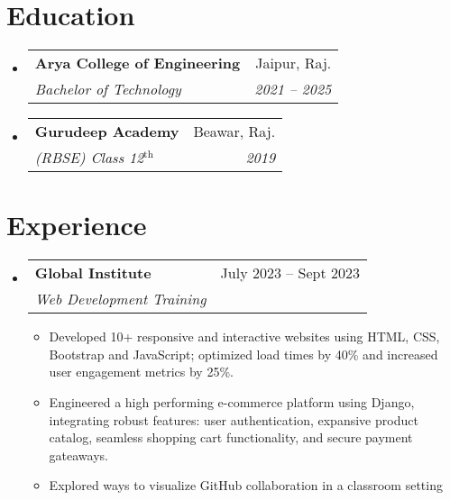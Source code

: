 \documentclass[letterpaper,11pt]{article}
\makeatletter
\newcommand{\resumeItem}[1]{
  \item\small{
    {#1 \vspace{-2pt}}
  }
}
\newcommand{\resumeSubheading}[4]{
  \vspace{-2pt}\item
    \begin{tabular*}{0.97\textwidth}[t]{l@{\extracolsep{\fill}}r}
      \textbf{#1} & #2 \\
      \textit{\small#3} & \textit{\small #4} \\
    \end{tabular*}\vspace{-7pt}
}
\newcommand{\resumeSubSubheading}[2]{
    \item
    \begin{tabular*}{0.97\textwidth}{l@{\extracolsep{\fill}}r}
      \textit{\small#1} & \textit{\small #2} \\
    \end{tabular*}\vspace{-7pt}
}
\newcommand{\resumeSubHeadingListStart}{\begin{itemize}[leftmargin=0.15in, label={}]}
\newcommand{\resumeSubHeadingListEnd}{\end{itemize}}
\newcommand{\resumeItemListStart}{\begin{itemize}}
\newcommand{\resumeItemListEnd}{\end{itemize}\vspace{-5pt}}
\makeatother
\begin{document}
\section{Education}
  \resumeSubHeadingListStart
    \resumeSubheading
      {Arya College of Engineering}{Jaipur, Raj.}
      {Bachelor of Technology}{2021 -- 2025}
    \resumeSubheading
      {Gurudeep Academy}{Beawar, Raj.}
      {(RBSE) Class 12$^{\text{th}}$}{2019}
  \resumeSubHeadingListEnd


\section{Experience}
  \resumeSubHeadingListStart

    \resumeSubheading
      {Global Institute}{July 2023 -- Sept 2023}
      {Web Development Training}{}
      \resumeItemListStart
        \resumeItem{Developed 10+ responsive and interactive websites using HTML, CSS, Bootstrap and JavaScript; optimized load times by 40\% and increased user engagement metrics by 25\%.}
        \resumeItem{Engineered a high performing e-commerce platform using Django, integrating robust features: user authentication, expansive product catalog, seamless shopping cart functionality, and secure payment gateaways.}
        \resumeItem{Explored ways to visualize GitHub collaboration in a classroom setting}
      \resumeItemListEnd
      

  \resumeSubHeadingListEnd


\end{document}
